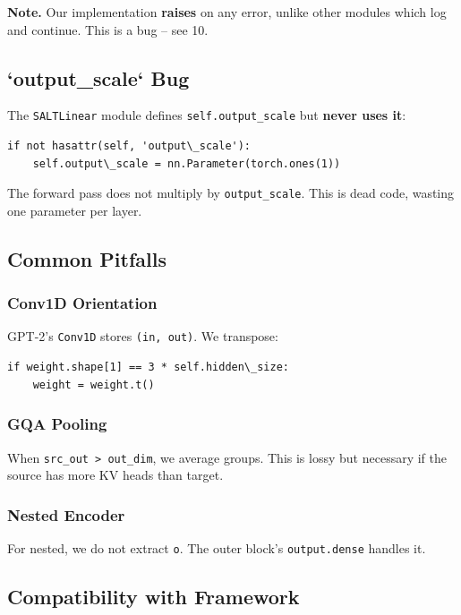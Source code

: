 \textbf{Note.} Our implementation \textbf{raises} on any error, unlike other modules 
which log and continue. This is a bug -- see  10.

\subsection{`output\_scale` Bug}

The \texttt{SALTLinear} module defines \texttt{self.output\_scale} but \textbf{never uses it}:

\begin{lstlisting}
if not hasattr(self, 'output\_scale'):
    self.output\_scale = nn.Parameter(torch.ones(1))
\end{lstlisting}

The forward pass does not multiply by \texttt{output\_scale}. This is dead code, 
wasting one parameter per layer.

\subsection{Common Pitfalls}

\subsubsection{Conv1D Orientation}

GPT-2's \texttt{Conv1D} stores \texttt{(in, out)}. We transpose:

\begin{lstlisting}
if weight.shape[1] == 3 * self.hidden\_size:
    weight = weight.t()
\end{lstlisting}

\subsubsection{GQA Pooling}

When \texttt{src\_out \textgreater{} out\_dim}, we average groups. This is lossy but necessary 
if the source has more KV heads than target.

\subsubsection{Nested Encoder}

For nested, we do not extract \texttt{o}. The outer block's \texttt{output.dense} handles it.

\subsection{Compatibility with Framework}

